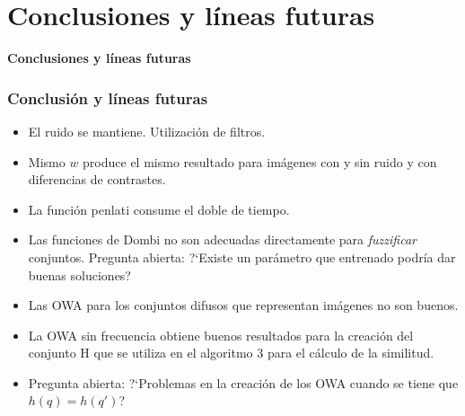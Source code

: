 \documentclass{beamer}
\theoremstyle{plain} %
\theoremstyle{definition}
\begin{document}
\section{Conclusiones y líneas futuras}
\begin{frame}
  \bfseries\Large\centering  Conclusiones y líneas futuras
\end{frame}

\begin{frame}
  \frametitle{Conclusión y líneas futuras}
  \begin{itemize}\pause
    \item El ruido se mantiene. Utilización de filtros.\pause
    \item Mismo $w$ produce el mismo resultado para imágenes con y sin ruido y con diferencias de contrastes.\pause
    \item La función penlati consume el doble de tiempo.\pause
    \item Las funciones de Dombi no son adecuadas directamente para {\em fuzzificar} conjuntos. Pregunta abierta: ?`Existe un parámetro que entrenado podría dar buenas soluciones?\pause
    \item Las OWA para los conjuntos difusos que representan imágenes no son buenos.\pause
    \item La OWA sin frecuencia obtiene buenos resultados para la creación del conjunto H que se utiliza en el algoritmo 3 para el cálculo de la similitud.\pause
    \item Pregunta abierta: ?`Problemas en la creación de los OWA cuando se tiene que $h(q)=h(q')$?\pause
  \end{itemize}
\end{frame}

\begin{frame}
  \titlepage
\end{frame}
\end{document}
